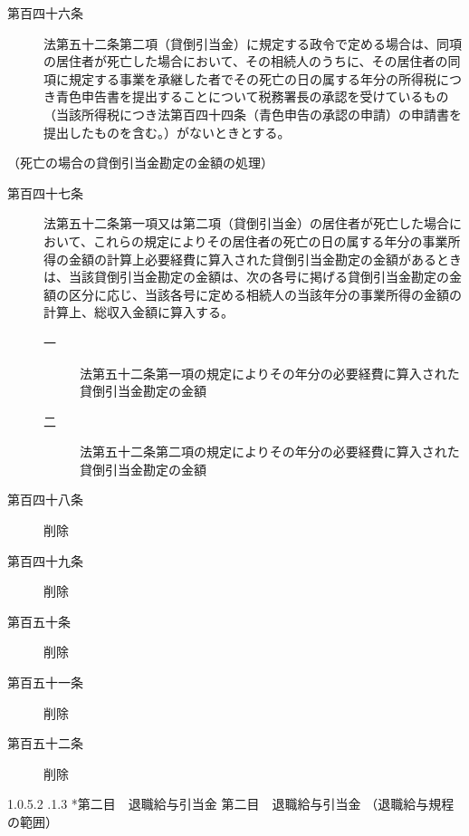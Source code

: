 \documentclass[twocolumn,a4j,10pt]{ltjtarticle}
\makeatletter
\newcommand{\subsubsubsection}{\@startsection{paragraph}{4}{\z@}%
  {1.0\Cvs \@plus.5\Cdp \@minus.2\Cdp}%
  {.1\Cvs \@plus.3\Cdp}%
  {\reset@font\sffamily\normalsize}
}
\makeatother
\begin{document}
\begin{description}
\item[第百四十六条]法第五十二条第二項（貸倒引当金）に規定する政令で定める場合は、同項の居住者が死亡した場合において、その相続人のうちに、その居住者の同項に規定する事業を承継した者でその死亡の日の属する年分の所得税につき青色申告書を提出することについて税務署長の承認を受けているもの（当該所得税につき法第百四十四条（青色申告の承認の申請）の申請書を提出したものを含む。）がないときとする。
\end{description}
\noindent\hspace{10pt}（死亡の場合の貸倒引当金勘定の金額の処理）
\begin{description}
\item[第百四十七条]法第五十二条第一項又は第二項（貸倒引当金）の居住者が死亡した場合において、これらの規定によりその居住者の死亡の日の属する年分の事業所得の金額の計算上必要経費に算入された貸倒引当金勘定の金額があるときは、当該貸倒引当金勘定の金額は、次の各号に掲げる貸倒引当金勘定の金額の区分に応じ、当該各号に定める相続人の当該年分の事業所得の金額の計算上、総収入金額に算入する。
\begin{description}
\item[一]法第五十二条第一項の規定によりその年分の必要経費に算入された貸倒引当金勘定の金額
\item[二]法第五十二条第二項の規定によりその年分の必要経費に算入された貸倒引当金勘定の金額
\end{description}
\end{description}
\begin{description}
\item[第百四十八条]削除
\end{description}
\begin{description}
\item[第百四十九条]削除
\end{description}
\begin{description}
\item[第百五十条]削除
\end{description}
\begin{description}
\item[第百五十一条]削除
\end{description}
\begin{description}
\item[第百五十二条]削除
\end{description}
\subsubsubsection*{第二目　退職給与引当金}
{第二目　退職給与引当金}
\noindent\hspace{10pt}（退職給与規程の範囲）
\end{document}
